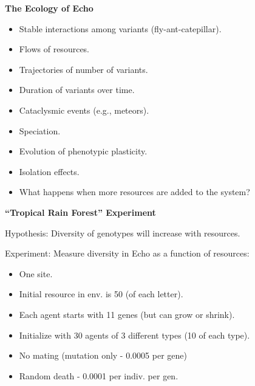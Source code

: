 %
%
\begin{slide}{}
\centerline{\bf The Ecology of Echo}
\begin{itemize}
\vskip 15pt
\itemsep 0pt
\parsep  0pt
\parskip 0pt
\item Stable interactions among variants (fly-ant-catepillar).
\vskip 6pt
\item Flows of resources.
\vskip 6pt
\item Trajectories of number of variants.
\vskip 6pt
\item Duration of variants over time.
\vskip 6pt
\item Cataclysmic events (e.g., meteors).
\vskip 6pt
\item Speciation.
\vskip 6pt
\item Evolution of phenotypic plasticity.
\vskip 6pt
\item Isolation effects.
\vskip 6pt
\item What happens when more resources are added to the system?
\end{itemize}
\end{slide}

\begin{note}
\end{note}


%
%
\begin{slide}{}
\centerline{\bf ``Tropical Rain Forest'' Experiment}
Hypothesis: Diversity of genotypes will increase with resources.

Experiment: Measure diversity in Echo as a function of resources:
\begin{itemize}
\itemsep 0pt
\parsep  0pt
\parskip 0pt
\item One site.
\vskip 6pt
\item Initial resource in env. is 50 (of each letter).
\vskip 6pt
\item Each agent starts with 11 genes (but can grow or shrink).
\vskip 6pt
\item Initialize with 30 agents of 3 different types (10 of each type).
\vskip 6pt
\item No mating (mutation only - 0.0005 per gene)
\vskip 6pt
\item Random death - 0.0001 per indiv. per gen.
\end{itemize}

\end{slide}


